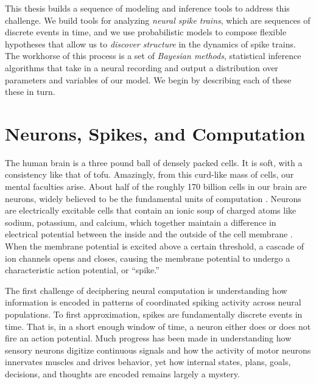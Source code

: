 This thesis builds a sequence of modeling and inference tools to
address this challenge. We build tools for analyzing \emph{neural spike
  trains}, which are sequences of discrete events in time, and we use
probabilistic models to compose flexible hypotheses that allow us to
\emph{discover structure} in the dynamics of spike trains.  The
workhorse of this process is a set of \emph{Bayesian methods},
statistical inference algorithms that take in a neural recording and
output a distribution over parameters and variables of our model.  We
begin by describing each of these these in turn.


\section{Neurons, Spikes, and Computation}
The human brain is a three pound ball of densely packed cells.  It is
soft, with a consistency like that of tofu.  Amazingly, from this
curd-like mass of cells, our mental faculties arise.  About half of
the roughly 170 billion cells in our brain are neurons, widely
believed to be the fundamental units of computation
\citep{DayanAbbott}.  Neurons are electrically excitable cells that
contain an ionic soup of charged atoms like sodium, potassium, and
calcium, which together maintain a difference in electrical potential
between the inside and the outside of the cell membrane
\citep{kandel2000principles}. When the membrane potential is excited
above a certain threshold, a cascade of ion channels opens and closes,
causing the membrane potential to undergo a characteristic action
potential, or ``spike.''

The first challenge of deciphering neural computation is understanding
how information is encoded in patterns of coordinated spiking activity
across neural populations. To first approximation, spikes are
fundamentally discrete events in time.  That is, in a short enough
window of time, a neuron either does or does not fire an action
potential.  Much progress has been made in understanding how sensory
neurons digitize continuous signals and how the activity of motor
neurons innervates muscles and drives behavior, yet how internal
states, plans, goals, decisions, and thoughts are encoded remains
largely a mystery.



